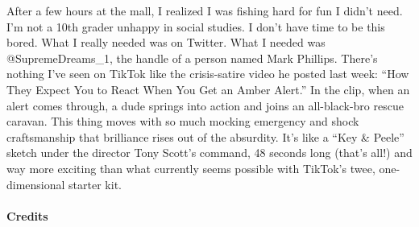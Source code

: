 After a few hours at the mall, I realized I was fishing hard for fun I
didn't need. I'm not a 10th grader unhappy in social studies. I don't
have time to be this bored. What I really needed was on Twitter. What I
needed was @SupremeDreams\_1, the handle of a person named Mark
Phillips. There's nothing I've seen on TikTok like the crisis-satire
video he posted last week: ``How They Expect You to React When You Get
an Amber Alert.'' In the clip, when an alert comes through, a dude
springs into action and joins an all-black-bro rescue caravan. This
thing moves with so much mocking emergency and shock craftsmanship that
brilliance rises out of the absurdity. It's like a ``Key \& Peele''
sketch under the director Tony Scott's command, 48 seconds long (that's
all!) and way more exciting than what currently seems possible with
TikTok's twee, one-dimensional starter kit.

\hypertarget{credits}{%
\paragraph{Credits}\label{credits}}

